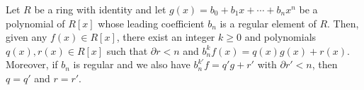 Let $R$ be a ring with identity and let $g(x) = b_0 + b_1 x + \cdots + b_n x^n$ be a polynomial of $R[x]$ whose leading coefficient $b_n$ is a regular element of $R$. Then, given any $f(x) \in R[x]$, there exist an integer $k \geq 0$ and polynomials $q(x), r(x) \in R[x]$ such that $\partial r < n$ and $b_n^k f(x) = q(x) g(x) + r(x)$. Moreover, if $b_n$ is regular and we also have $b_n^{k'} f = q' g + r'$ with $\partial r' < n$, then $q = q'$ and $r = r'$.
